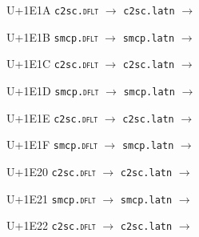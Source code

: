 \documentclass{article}
\begin{document}
\begin{substitutions}
\goodbreak

U+1E1A  \linebreak
    \texttt{c2sc.\textsc{dflt}} $\to$  \linebreak
    \texttt{c2sc.latn} $\to$  

\goodbreak

U+1E1B  \linebreak
    \texttt{smcp.\textsc{dflt}} $\to$  \linebreak
    \texttt{smcp.latn} $\to$  

\goodbreak

U+1E1C  \linebreak
    \texttt{c2sc.\textsc{dflt}} $\to$  \linebreak
    \texttt{c2sc.latn} $\to$  

\goodbreak

U+1E1D  \linebreak
    \texttt{smcp.\textsc{dflt}} $\to$  \linebreak
    \texttt{smcp.latn} $\to$  

\goodbreak

U+1E1E  \linebreak
    \texttt{c2sc.\textsc{dflt}} $\to$  \linebreak
    \texttt{c2sc.latn} $\to$  

\goodbreak

U+1E1F  \linebreak
    \texttt{smcp.\textsc{dflt}} $\to$  \linebreak
    \texttt{smcp.latn} $\to$  

\goodbreak

U+1E20  \linebreak
    \texttt{c2sc.\textsc{dflt}} $\to$  \linebreak
    \texttt{c2sc.latn} $\to$  

\goodbreak

U+1E21  \linebreak
    \texttt{smcp.\textsc{dflt}} $\to$  \linebreak
    \texttt{smcp.latn} $\to$  

\goodbreak

U+1E22  \linebreak
    \texttt{c2sc.\textsc{dflt}} $\to$  \linebreak
    \texttt{c2sc.latn} $\to$  


\end{substitutions}
\end{document}
